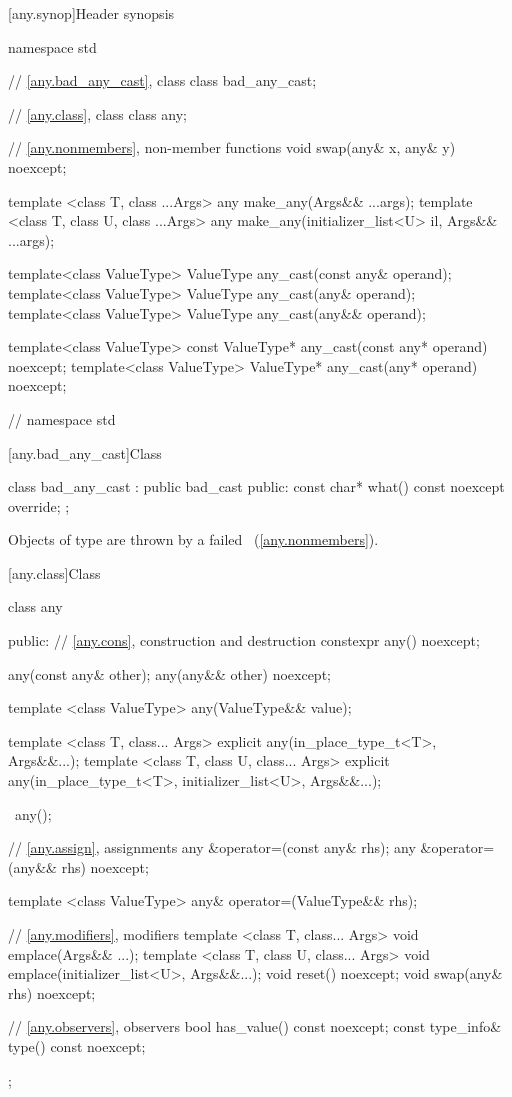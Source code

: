 %
[any.synop]{Header  synopsis}

\begin{codeblock}
namespace std {
  // \ref{any.bad_any_cast}, class 
  class bad_any_cast;

  // \ref{any.class}, class 
  class any;

  // \ref{any.nonmembers}, non-member functions
  void swap(any& x, any& y) noexcept;

  template <class T, class ...Args>
    any make_any(Args&& ...args);
  template <class T, class U, class ...Args>
    any make_any(initializer_list<U> il, Args&& ...args);

  template<class ValueType>
    ValueType any_cast(const any& operand);
  template<class ValueType>
    ValueType any_cast(any& operand);
  template<class ValueType>
    ValueType any_cast(any&& operand);
  
  template<class ValueType>
    const ValueType* any_cast(const any* operand) noexcept;
  template<class ValueType>
    ValueType* any_cast(any* operand) noexcept;
} // namespace std
\end{codeblock}

[any.bad_any_cast]{Class }

%
\begin{codeblock}
class bad_any_cast : public bad_cast {
public:
  const char* what() const noexcept override;
};
\end{codeblock}

\pnum
Objects of type  are thrown by a failed ~(\ref{any.nonmembers}).

[any.class]{Class }

\begin{codeblock}
class any {
public:
  // \ref{any.cons}, construction and destruction
  constexpr any() noexcept;

  any(const any& other);
  any(any&& other) noexcept;

  template <class ValueType> any(ValueType&& value);

  template <class T, class... Args>
    explicit any(in_place_type_t<T>, Args&&...);
  template <class T, class U, class... Args>
    explicit any(in_place_type_t<T>, initializer_list<U>, Args&&...);

  ~any();

  // \ref{any.assign}, assignments
  any &operator=(const any& rhs);
  any &operator=(any&& rhs) noexcept;

  template <class ValueType> any& operator=(ValueType&& rhs);

  // \ref{any.modifiers}, modifiers
  template <class T, class... Args>
    void emplace(Args&& ...);
  template <class T, class U, class... Args>
    void emplace(initializer_list<U>, Args&&...);
  void reset() noexcept;
  void swap(any& rhs) noexcept;

  // \ref{any.observers}, observers
  bool has_value() const noexcept;
  const type_info& type() const noexcept;
};
\end{codeblock}

